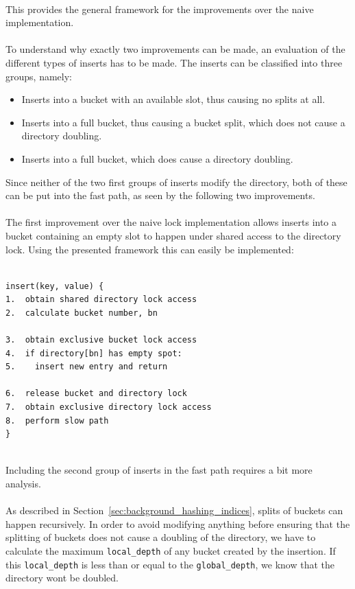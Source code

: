 \documentclass[11pt]{report} %
\begin{document}
\vphantom{fill}\\
This provides the general framework for the improvements over the naive implementation. \\
\\
To understand why exactly two improvements can be made, an evaluation of the different types of inserts has to be made. The inserts can be classified into three groups, namely:
\begin{itemize}[noitemsep]
  \item Inserts into a bucket with an available slot, thus causing no splits at all.
  \item Inserts into a full bucket, thus causing a bucket split, which does not cause a directory doubling.
  \item Inserts into a full bucket, which does cause a directory doubling.
\end{itemize}
Since neither of the two first groups of inserts modify the directory, both of these can be put into the fast path, as seen by the following two improvements.\\
\\
The first improvement over the naive lock implementation allows inserts into a bucket containing an empty slot to happen under shared access to the directory lock. Using the presented framework this can easily be implemented: \\
\\
\begin{fminipage}{\linewidth}
\begin{lstlisting}[]
insert(key, value) {
1.  obtain shared directory lock access
2.  calculate bucket number, bn

3.  obtain exclusive bucket lock access
4.  if directory[bn] has empty spot:
5.    insert new entry and return

6.  release bucket and directory lock
7.  obtain exclusive directory lock access
8.  perform slow path
}
\end{lstlisting}
\end{fminipage}
\vphantom{fill}\\
Including the second group of inserts in the fast path requires a bit more analysis. \\
\\
As described in Section~\ref{sec:background_hashing_indices}, splits of buckets can happen recursively. In order to avoid modifying anything before ensuring that the splitting of buckets does not cause a doubling of the directory, we have to calculate the maximum \verb|local_depth| of any bucket created by the insertion. If this \verb|local_depth| is less than or equal to the \verb|global_depth|, we know that the directory wont be doubled. \\
\end{document}
